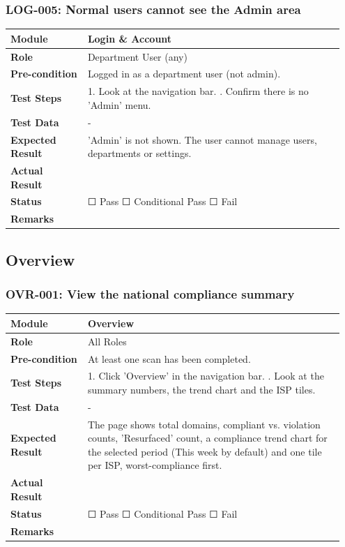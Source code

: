 \documentclass[10pt]{article}
\begin{document}
\subsubsection*{LOG-005: Normal users cannot see the Admin area}
\begin{longtable}{p{0.22\linewidth}p{0.73\linewidth}}
\hline
\textbf{Module} & Login \& Account \\ \hline
\textbf{Role} & Department User (any) \\ \hline
\textbf{Pre-condition} & Logged in as a department user (not admin). \\ \hline
\textbf{Test Steps} & 1. Look at the navigation bar. \newline 2. Confirm there is no 'Admin' menu. \\ \hline
\textbf{Test Data} & - \\ \hline
\textbf{Expected Result} & 'Admin' is not shown. The user cannot manage users, departments or settings. \\ \hline
\textbf{Actual Result} & \newline \newline \\ \hline
\textbf{Status} & ☐ Pass \quad ☐ Conditional Pass \quad ☐ Fail \\ \hline
\textbf{Remarks} & \newline \\ \hline
\end{longtable}
\subsection{Overview}
\subsubsection*{OVR-001: View the national compliance summary}
\begin{longtable}{p{0.22\linewidth}p{0.73\linewidth}}
\hline
\textbf{Module} & Overview \\ \hline
\textbf{Role} & All Roles \\ \hline
\textbf{Pre-condition} & At least one scan has been completed. \\ \hline
\textbf{Test Steps} & 1. Click 'Overview' in the navigation bar. \newline 2. Look at the summary numbers, the trend chart and the ISP tiles. \\ \hline
\textbf{Test Data} & - \\ \hline
\textbf{Expected Result} & The page shows total domains, compliant vs. violation counts, 'Resurfaced' count, a compliance trend chart for the selected period (This week by default) and one tile per ISP, worst-compliance first. \\ \hline
\textbf{Actual Result} & \newline \newline \\ \hline
\textbf{Status} & ☐ Pass \quad ☐ Conditional Pass \quad ☐ Fail \\ \hline
\textbf{Remarks} & \newline \\ \hline
\end{longtable}
\end{document}
